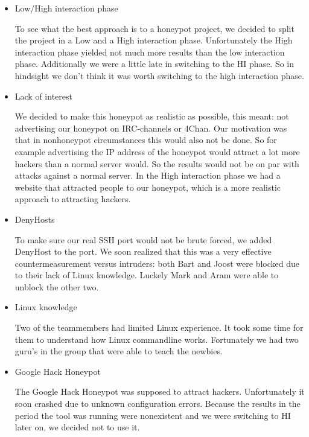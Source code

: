 \documentclass[11pt]{article}
\begin{document}
\begin{itemize}
\item Low/High interaction phase

To see what the best approach is to a honeypot project, we decided to split the project in a Low and a High interaction phase. Unfortunately the High interaction phase yielded not much more results than the low interaction phase. Additionally we were a little late in switching to the HI phase. So in hindsight we don't think it was worth switching to the high interaction phase.

\item Lack of interest

We decided to make this honeypot as realistic as possible, this meant: not advertising our honeypot on IRC-channels or 4Chan. Our motivation was that in nonhoneypot circumstances this would also not be done. So for example advertising the IP address of the honeypot would attract a lot more hackers than a normal server would. So the results would not be on par with attacks against a normal server. In the High interaction phase we had a website that attracted people to our honeypot, which is a more realistic approach to attracting hackers.

\item DenyHosts

To make sure our real SSH port would not be brute forced, we added DenyHost to the port. We soon realized that this was a very effective countermeasurement versus intruders: both Bart and Joost were blocked due to their lack of Linux knowledge. Luckely Mark and Aram were able to unblock the other two.

\item Linux knowledge

Two of the teammembers had limited Linux experience. It took some time for them to understand how Linux commandline works. Fortunately we had two guru's in the group that were able to teach the newbies.

\item Google Hack Honeypot

The Google Hack Honeypot was supposed to attract hackers. Unfortunately it soon crashed due to unknown configuration errors. Because the results in the period the tool was running were nonexistent and we were switching to HI later on, we decided not to use it. 

\end{itemize}



\end{document}
